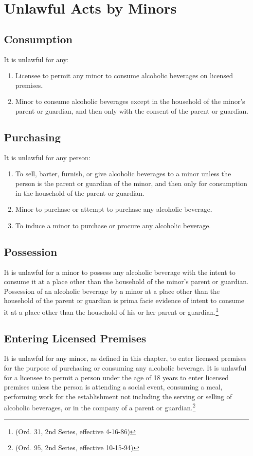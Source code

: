 \section{Unlawful Acts by Minors}
\subsection{Consumption}
It is unlawful for any:
\begin{enumerate}[{\indent}1)]
    \item Licensee to permit any minor to consume alcoholic beverages on licensed premises.
    \item Minor to consume alcoholic beverages except in the household of the minor’s parent or guardian, and then only with the consent of the parent or guardian.
\end{enumerate}
\subsection{Purchasing}
It is unlawful for any person:
\begin{enumerate}[{\indent}1)]
    \item To sell, barter, furnish, or give alcoholic beverages to a minor unless the person is the parent or guardian of the minor, and then only for consumption in the household of the parent or guardian.
    \item Minor to purchase or attempt to purchase any alcoholic beverage.
    \item To induce a minor to purchase or procure any alcoholic beverage.
\end{enumerate}
\subsection{Possession}
It is unlawful for a minor to possess any alcoholic beverage with the intent to consume it at a place other than the household of the minor’s parent or guardian.  Possession of an alcoholic beverage by a minor at a place other than the household of the parent or guardian is prima facie evidence of intent to consume it at a place other than the household of his or her parent or guardian.\footnote{(Ord. 31, 2nd Series, effective 4-16-86)}
\subsection{Entering Licensed Premises}
It is unlawful for any minor, as defined in this chapter, to enter licensed premises for the purpose of purchasing or consuming any alcoholic beverage.  It is unlawful for a licensee to permit a person under the age of 18 years to enter licensed premises unless the person is attending a social event, consuming a meal, performing work for the establishment not including the serving or selling of alcoholic beverages, or in the company of a parent or guardian.\footnote{(Ord. 95, 2nd Series, effective 10-15-94)}
